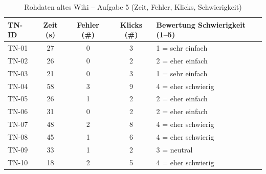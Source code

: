 \begin{table}[H]
\centering
\caption{Rohdaten altes Wiki -- Aufgabe 5 (Zeit, Fehler, Klicks, Schwierigkeit)}
\label{tab:BB-alt-task5}
\begin{tabularx}{\textwidth}{l c c c X}
\toprule
TN-ID & Zeit (s) & Fehler (\#) & Klicks (\#) & Bewertung Schwierigkeit (1--5) \\
\midrule
TN-01 & 27 & 0 & 3 & 1 = sehr einfach \\
TN-02 & 26 & 0 & 2 & 2 = eher einfach \\
TN-03 & 21 & 0 & 3 & 1 = sehr einfach \\
TN-04 & 58 & 3 & 9 & 4 = eher schwierig \\
TN-05 & 26 & 1 & 2 & 2 = eher einfach \\
TN-06 & 31 & 0 & 2 & 2 = eher einfach \\
TN-07 & 48 & 2 & 8 & 4 = eher schwierig \\
TN-08 & 45 & 1 & 6 & 4 = eher schwierig \\
TN-09 & 33 & 1 & 2 & 3 = neutral \\
TN-10 & 18 & 2 & 5 & 4 = eher schwierig \\
\bottomrule
\end{tabularx}
\end{table}
